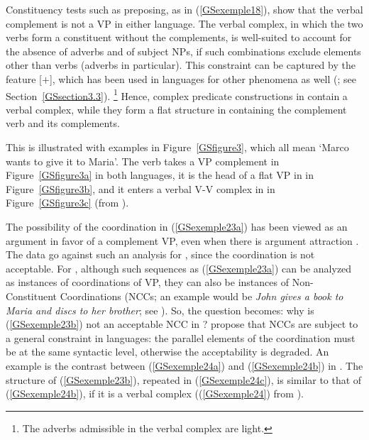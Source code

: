 \label{GSexemple23b}	
\zl

\noindent
Constituency tests such as preposing, as in (\ref{GSexemple18}), show that the verbal complement is not a VP in either language. The verbal complex, in which the two verbs form a constituent without the complements, is well-suited to account for the absence of adverbs and of subject NPs, if such combinations exclude elements other than verbs (adverbs in particular). This constraint can be captured by the feature [\light{}$+$], which has been used in  languages for other phenomena as well (\citealt{abeille2000french}; see Section~\ref{GSsection3.3}).%
    \footnote{The adverbs admissible in the  verbal complex are light.}
Hence, complex predicate constructions in  contain a verbal complex, while they form a flat structure in  containing the complement verb and its complements. 

This is illustrated with examples in Figure~\ref{GSfigure3}, which all mean `Marco wants to give it to Maria'. The verb takes a VP complement in Figure~\ref{GSfigure3a} in both languages, it is the head of a flat VP in  in Figure~\ref{GSfigure3b}, and it enters a verbal V-V complex in  in Figure~\ref{GSfigure3c} (from \citealt[146]{AG2010}).

The possibility of the coordination in (\ref{GSexemple23a}) has been viewed as an argument in favor
of a complement VP, even when there is argument attraction \citep{andrews1999complex}. The data go
against such an analysis for , since the coordination is not acceptable. For ,
although such sequences as (\ref{GSexemple23a}) can be analyzed as instances of coordinations of VP, they can
also be instances of Non-Constituent Coordinations (NCCs; an  example would be \emph{John gives a book to Maria and discs to her brother}; see ). 
So, the question becomes: why is (\ref{GSexemple23b}) not an acceptable NCC in ?
\citet{AG2010} propose that NCCs are subject to a general constraint in 
languages: the parallel elements of the coordination must be at the same syntactic level, otherwise
the acceptability is degraded. An example is the contrast between (\ref{GSexemple24a}) and
(\ref{GSexemple24b}) in . The structure of (\ref{GSexemple23b}), repeated in
(\ref{GSexemple24c}), is similar to that of (\ref{GSexemple24b}), if it is a verbal complex ((\ref{GSexemple24}) from \citealt[137, 144]{AG2010}).

